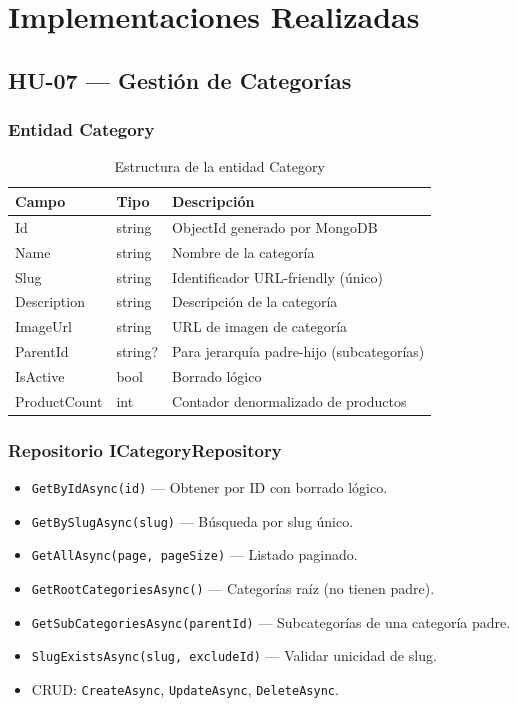 \documentclass[12pt,a4paper]{article}
\begin{document}
\newpage

\section{Implementaciones Realizadas}

\subsection{HU-07 --- Gesti\'on de Categor\'ias}

\subsubsection{Entidad Category}
\begin{table}[H]\centering
\begin{tabularx}{\textwidth}{l l X}
\toprule\rowcolor{lightblue}
\textbf{Campo} & \textbf{Tipo} & \textbf{Descripci\'on}\\
\midrule
Id & string & ObjectId generado por MongoDB\\
\rowcolor{lightgray}
Name & string & Nombre de la categor\'ia\\
Slug & string & Identificador URL-friendly (\'unico)\\
\rowcolor{lightgray}
Description & string & Descripci\'on de la categor\'ia\\
ImageUrl & string & URL de imagen de categor\'ia\\
\rowcolor{lightgray}
ParentId & string? & Para jerarqu\'ia padre-hijo (subcategor\'ias)\\
IsActive & bool & Borrado l\'ogico\\
\rowcolor{lightgray}
ProductCount & int & Contador denormalizado de productos\\
\bottomrule
\end{tabularx}
\caption{Estructura de la entidad Category}
\end{table}

\subsubsection{Repositorio ICategoryRepository}
\begin{itemize}[leftmargin=1.5em]
  \item \texttt{GetByIdAsync(id)} --- Obtener por ID con borrado l\'ogico.
  \item \texttt{GetBySlugAsync(slug)} --- B\'usqueda por slug \'unico.
  \item \texttt{GetAllAsync(page, pageSize)} --- Listado paginado.
  \item \texttt{GetRootCategoriesAsync()} --- Categor\'ias raíz (no tienen padre).
  \item \texttt{GetSubCategoriesAsync(parentId)} --- Subcategor\'ias de una categor\'ia padre.
  \item \texttt{SlugExistsAsync(slug, excludeId)} --- Validar unicidad de slug.
  \item CRUD: \texttt{CreateAsync}, \texttt{UpdateAsync}, \texttt{DeleteAsync}.
\end{itemize}
\end{document}
